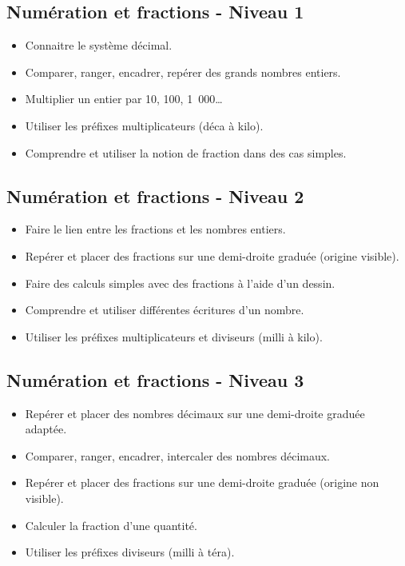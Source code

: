 \documentclass[a4paper,12pt,fleqn]{article}
\begin{document}
\renewcommand{\labelitemi}{}

\subsection*{Numération et fractions - Niveau 1}

\begin{itemize}
	\item {}Connaitre le système décimal.
	\item {}Comparer, ranger, encadrer, repérer des grands nombres entiers.
	\item {}Multiplier un entier par 10, 100, 1~000\ldots
	\item {}Utiliser les préfixes multiplicateurs (déca à kilo).
	\item {}Comprendre et utiliser la notion de fraction dans des cas simples.

\end{itemize}

\subsection*{Numération et fractions - Niveau 2}

\begin{itemize}
	\item {}Faire le lien entre les fractions et les nombres entiers.
	\item {}Repérer et placer des fractions sur une demi-droite graduée (origine visible).
	\item {}Faire des calculs simples avec des fractions à l’aide d’un dessin.
	\item {}Comprendre et utiliser différentes écritures d’un nombre.
	\item {}Utiliser les préfixes multiplicateurs et diviseurs (milli à kilo).
\end{itemize}

\subsection*{Numération et fractions - Niveau 3}

\begin{itemize}
	\item {}Repérer et placer des nombres décimaux sur une demi-droite graduée adaptée.
	\item {}Comparer, ranger, encadrer, intercaler des nombres décimaux.
	\item {}Repérer et placer des fractions sur une demi-droite graduée (origine non visible).
	\item  {}Calculer la fraction d’une quantité.
	\item {}Utiliser les préfixes diviseurs (milli à téra).
\end{itemize}
\end{document}
